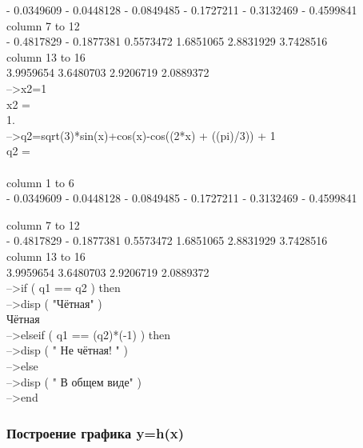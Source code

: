 \documentclass[russian,utf8,nocolumnxxxi,nocolumnxxxii]{eskdtext}
\begin{document}
  - 0.0349609  - 0.0448128  - 0.0849485  - 0.1727211  - 0.3132469  - 0.4599841  \\

         column  7 to 12\\

  - 0.4817829  - 0.1877381    0.5573472    1.6851065    2.8831929    3.7428516  \\

         column 13 to 16\\

    3.9959654    3.6480703    2.9206719    2.0889372  \\

-->x2=1\\
 x2  =\\

    1.
\\
-->q2=sqrt(3)*sin(x)+cos(x)-cos((2*x) + ((pi)/3)) + 1\\
 q2  =
 \\
\\

         column 1 to 6\\

  - 0.0349609  - 0.0448128  - 0.0849485  - 0.1727211  - 0.3132469  - 0.4599841

         column  7 to 12\\

  - 0.4817829  - 0.1877381    0.5573472    1.6851065    2.8831929    3.7428516  \\

         column 13 to 16\\

    3.9959654    3.6480703    2.9206719    2.0889372 \\

-->if ( q1 == q2 ) then\\
-->disp ( "Чётная" )\\

 Чётная  \\
-->elseif ( q1 == (q2)*(-1) ) then\\
-->disp ( " Не чётная! " )\\
-->else\\
-->disp ( " В общем виде" )\\
-->end\\

\subsubsection{Построение графика y=h(x)}
\end{document}
